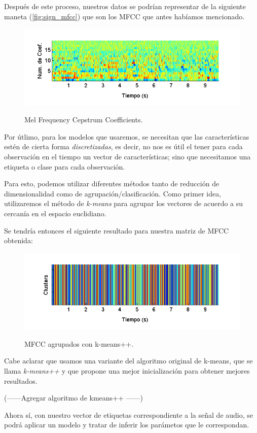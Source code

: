 Después de este proceso, nuestros datos se podrían representar de la siguiente maneta (\autoref{fig:sign_mfcc}) que son los MFCC que antes habíamos mencionado.
\begin{figure}[bth]
  \myfloatalign
  {\includegraphics[width=0.9\linewidth]{gfx/chap5/signal-mfcc}} \quad
  \caption{Mel Frequency Cepstrum Coefficients.}
  \label{fig:sign_mfcc}
\end{figure}

Por útlimo, para los modelos que usaremos, se necesitan que las características estén de cierta forma \textit{discretizadas}, es decir, no nos es útil el tener para cada observación en el tiempo un vector de características; sino que necesitamos una etiqueta o clase para cada observación. 

Para esto, podemos utilizar diferentes métodos tanto de reducción de dimensionalidad como de agrupación/clasificación. Como primer idea, utilizaremos el método de \textit{k-means} para agrupar los vectores de acuerdo a su cercanía en el espacio euclidiano.

Se tendría entonces el siguiente resultado para nuestra matriz de MFCC obtenida:
\begin{figure}[bth]
  {\includegraphics[width=0.9\linewidth]{gfx/chap5/signal-clusters}} \quad
  \caption{MFCC agrupados con k-means++.}
  \label{fig:sign_clusters}
\end{figure}
Cabe aclarar que usamos una variante del algoritmo original de k-means, que se llama \textit{k-means++} y que propone una mejor inicialización para obtener mejores resultados.

(------Agregar algoritmo de kmeans++ ------)

Ahora sí, con nuestro vector de etiquetas correspondiente a la señal de audio, se podrá aplicar un modelo y tratar de inferir los parámetos que le correspondan.


